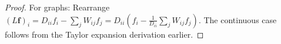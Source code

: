 \begin{notechapter}
\begin{proof}
For graphs: Rearrange $(L\mathbf{f})_i = D_{ii}f_i - \sum_j W_{ij}f_j = D_{ii}(f_i - \frac{1}{D_{ii}}\sum_j W_{ij}f_j)$. The continuous case follows from the Taylor expansion derivation earlier.
\end{proof}
\end{notechapter}
